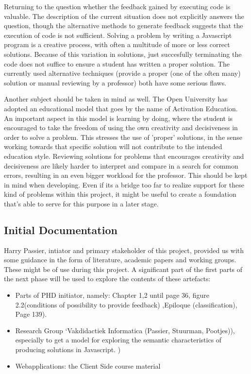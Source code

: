 \documentclass{article}
\begin{document}
Returning to the question whether the feedback gained by executing code is valuable. The description of the current situation does not explicitly answers the question, though the alternative methods to generate feedback suggests that the execution of code is not sufficient. Solving a problem by writing a Javascript program is a creative process, with often a multitude of more or less correct solutions. Because of this variation in solutions, just succesfully terminating the code does not suffice to ensure a student has written a proper solution. The currently used alternative techniques (provide a proper (one of the often many) solution or manual reviewing by a professor) both have some serious flaws. 

Another subject should be taken in mind as well. The Open University has adopted an educational model that goes by the name of Activation Education. An important aspect in this model is learning by doing, where the student is encouraged to take the freedom of using the own creativity and decisiveness in order to solve a problem. This stresses the use of 'proper' solutions, in the sense working towards that specific solution will not contribute to the intended education style. Reviewing solutions for problems that encourages creativity and decisiveness are likely harder to interpret and compare in a search for common errors, resulting in an even bigger workload for the professor. This should be kept in mind when developing. Even if its a bridge too far to realize support for these kind of problems within this project, it might be useful to create a foundation that's able to serve for this purpose in a later stage.

\subsection{Initial Documentation}

Harry Passier, intiator and primary stakeholder of this project, provided us with some guidance in the form of literature, academic papers and working groups. These might be of use during this project. A significant part of the first parts of the next phase will be used to explore the contents of these artefacts:
\begin{itemize}
  \item Parts of PHD initiator, namely: Chapter 1,2 until page 36, figure 2.2(conditions of possibility to provide feedback) ,Epiloque (classification), Page 139).
  \item Research Group ‘Vakdidactiek Informatica (Passier, Stuurman, Pootjes)), especially to get a model for exploring the semantic characteristics of producing solutions in Javascript. )
  \item Webapplications: the Client Side course material
\end{itemize}
\end{document}
